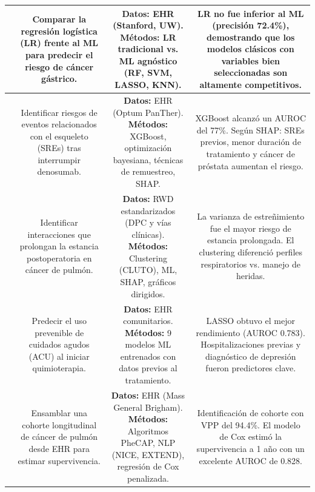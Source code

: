 \begin{table}[p]
\begin{tabular}{|c|c|c|c|}
\parbox[t]{1.2cm}{\centering \cite{article5}} & \parbox[t]{4.0cm}{Comparar la regresión logística (LR) frente al ML para predecir el riesgo de cáncer gástrico.} & \parbox[t]{5.0cm}{\textbf{Datos:} EHR (Stanford, UW). \newline \textbf{Métodos:} LR tradicional vs. ML agnóstico (RF, SVM, LASSO, KNN).} & \parbox[t]{5.0cm}{LR no fue inferior al ML (precisión 72.4\%), demostrando que los modelos clásicos con variables bien seleccionadas son altamente competitivos.} \\ \hline
\parbox[t]{1.2cm}{\centering \cite{article6}} & \parbox[t]{4.0cm}{Identificar riesgos de eventos relacionados con el esqueleto (SREs) tras interrumpir denosumab.} & \parbox[t]{5.0cm}{\textbf{Datos:} EHR (Optum PanTher). \newline \textbf{Métodos:} XGBoost, optimización bayesiana, técnicas de remuestreo, SHAP.} & \parbox[t]{5.0cm}{XGBoost alcanzó un AUROC del 77\%. Según SHAP: SREs previos, menor duración de tratamiento y cáncer de próstata aumentan el riesgo.} \\ \hline
\parbox[t]{1.2cm}{\centering \cite{article7}} & \parbox[t]{4.0cm}{Identificar interacciones que prolongan la estancia postoperatoria en cáncer de pulmón.} & \parbox[t]{5.0cm}{\textbf{Datos:} RWD estandarizados (DPC y vías clínicas). \newline \textbf{Métodos:} Clustering (CLUTO), ML, SHAP, gráficos dirigidos.} & \parbox[t]{5.0cm}{La varianza de estreñimiento fue el mayor riesgo de estancia prolongada. El clustering diferenció perfiles respiratorios vs. manejo de heridas.} \\ \hline
\parbox[t]{1.2cm}{\centering \cite{article8}} & \parbox[t]{4.0cm}{Predecir el uso prevenible de cuidados agudos (ACU) al iniciar quimioterapia.} & \parbox[t]{5.0cm}{\textbf{Datos:} EHR comunitarios. \newline \textbf{Métodos:} 9 modelos ML entrenados con datos previos al tratamiento.} & \parbox[t]{5.0cm}{LASSO obtuvo el mejor rendimiento (AUROC 0.783). Hospitalizaciones previas y diagnóstico de depresión fueron predictores clave.} \\ \hline
\parbox[t]{1.2cm}{\centering \cite{article9}} & \parbox[t]{4.0cm}{Ensamblar una cohorte longitudinal de cáncer de pulmón desde EHR para estimar supervivencia.} & \parbox[t]{5.0cm}{\textbf{Datos:} EHR (Mass General Brigham). \newline \textbf{Métodos:} Algoritmos PheCAP, NLP (NICE, EXTEND), regresión de Cox penalizada.} & \parbox[t]{5.0cm}{Identificación de cohorte con VPP del 94.4\%. El modelo de Cox estimó la supervivencia a 1 año con un excelente AUROC de 0.828.} \\ \hline

\end{tabular}
\end{table}
